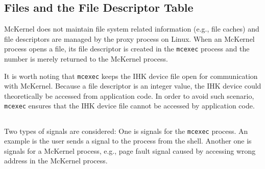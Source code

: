 \documentclass[twoside,11pt,fleqn]{book}
\begin{document}

\subsection{Files and the File Descriptor Table}
\label{sec:proxy_files}
McKernel does not maintain file system related information (e.g., file caches)
and file descriptors are managed by the proxy process on Linux.
When an McKernel process opens a file, its file descriptor is created
in the \texttt{mcexec} process and the number is merely returned to
the McKernel process.

It is worth noting that \texttt{mcexec} keeps the IHK device file open
for communication with McKernel. Because a file descriptor is an integer value,
the IHK device could theoretically be accessed from application code.
In order to avoid such scenario, \texttt{mcexec} ensures that the IHK device
file cannot be accessed by application code.

\subsection{}
\label{sec:signaling}
Two types of signals are considered:
One is signals for the \texttt{mcexec} process. An example is
the user sends a signal to the process from the shell.
Another one is signals for a McKernel process, e.g., page fault
signal caused by accessing wrong address in the McKernel process.
\end{document}
